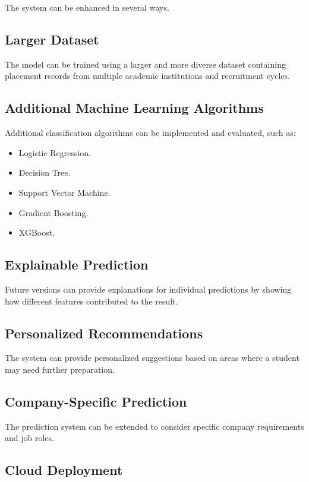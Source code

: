 \documentclass[12pt,a4paper]{report}
\begin{document}
The system can be enhanced in several ways.

\subsection{Larger Dataset}

The model can be trained using a larger and more diverse dataset
containing placement records from multiple academic institutions
and recruitment cycles.

\subsection{Additional Machine Learning Algorithms}

Additional classification algorithms can be implemented and
evaluated, such as:

\begin{itemize}
    \item Logistic Regression.
    \item Decision Tree.
    \item Support Vector Machine.
    \item Gradient Boosting.
    \item XGBoost.
\end{itemize}

\subsection{Explainable Prediction}

Future versions can provide explanations for individual
predictions by showing how different features contributed to the
result.

\subsection{Personalized Recommendations}

The system can provide personalized suggestions based on areas
where a student may need further preparation.

\subsection{Company-Specific Prediction}

The prediction system can be extended to consider specific
company requirements and job roles.

\subsection{Cloud Deployment}
\end{document}
